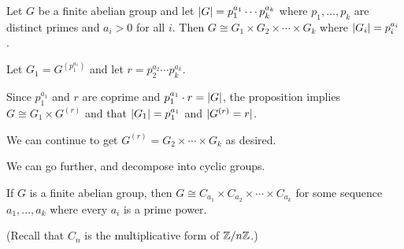 \documentclass[12pt,letterpaper]{report}
\begin{document}
\begin{cor}{}{}
  Let $G$ be a finite abelian group and let $\lvert G\rvert = p_1^{a_1} \cdots p_k^{a_k}$ where
  $p_1, \ldots, p_k$ are distinct primes and $a_i > 0$ for all $i$.
  Then $G \cong G_1 \times G_2 \times \cdots \times G_k$ where $\lvert G_i\rvert = p_i^{a_i}$.
\end{cor}

\begin{thmproof}
  Let $G_1 = G^{(p_1^{a_1})}$ and let $r = p_2^{a_2} \cdots p_k^{a_k}$.

  Since $p_1^{a_1}$ and $r$ are coprime and $p_1^{a_1} \cdot r = \lvert G\rvert$, the proposition implies
  $G \cong G_1 \times G^{(r)}$ and that $\lvert G_1\rvert = p_1^{a_1}$ and $\lvert G^{(r)} = r\rvert$.

  We can continue to get $G^{(r)} = G_2 \times \cdots \times G_k$ as desired.
\end{thmproof}

We can go further, and decompose into cyclic groups.

\begin{prop}{}{}
  If $G$ is a finite abelian group, then
  $G \cong C_{a_1} \times C_{a_2} \times \cdots \times C_{a_k}$ for some sequence $a_1, \ldots, a_k$
  where every $a_i$ is a prime power.
\end{prop}

(Recall that $C_n$ is the multiplicative form of $\mathbb{Z}/{n}\mathbb{Z}$.)
\end{document}
